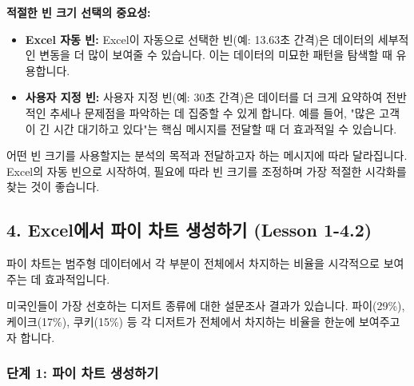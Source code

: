 \documentclass[11pt,a4paper]{article}
\begin{document}
\begin{tipbox}
\textbf{적절한 빈 크기 선택의 중요성:}
\begin{itemize}
    \item \textbf{Excel 자동 빈:} Excel이 자동으로 선택한 빈(예: 13.63초 간격)은 데이터의 세부적인 변동을 더 많이 보여줄 수 있습니다. 이는 데이터의 미묘한 패턴을 탐색할 때 유용합니다.
    \item \textbf{사용자 지정 빈:} 사용자 지정 빈(예: 30초 간격)은 데이터를 더 크게 요약하여 전반적인 추세나 문제점을 파악하는 데 집중할 수 있게 합니다. 예를 들어, "많은 고객이 긴 시간 대기하고 있다"는 핵심 메시지를 전달할 때 더 효과적일 수 있습니다.
\end{itemize}
어떤 빈 크기를 사용할지는 분석의 목적과 전달하고자 하는 메시지에 따라 달라집니다. Excel의 자동 빈으로 시작하여, 필요에 따라 빈 크기를 조정하며 가장 적절한 시각화를 찾는 것이 좋습니다.
\end{tipbox}

\newpage
\subsection*{4. Excel에서 파이 차트 생성하기 (Lesson 1-4.2)}

파이 차트는 범주형 데이터에서 각 부분이 전체에서 차지하는 비율을 시각적으로 보여주는 데 효과적입니다.

\begin{tcolorbox}[title=\textbf{시나리오: 미국인 디저트 선호도 분석},colback=myblue!5!white,colframe=myblue!75!black]
미국인들이 가장 선호하는 디저트 종류에 대한 설문조사 결과가 있습니다. 파이(29\%), 케이크(17\%), 쿠키(15\%) 등 각 디저트가 전체에서 차지하는 비율을 한눈에 보여주고자 합니다.
\end{tcolorbox}

\subsubsection*{단계 1: 파이 차트 생성하기}
\end{document}
